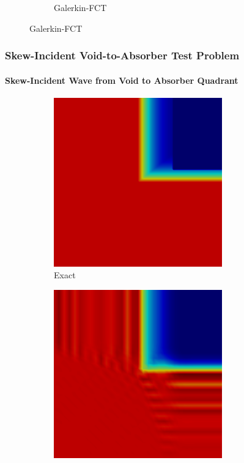 \begin{frame}
\begin{figure}[h]
\begin{subfigure}{0.45\textwidth}
      \caption{Galerkin-FCT}
   \end{subfigure}
\end{figure}

\end{frame}
\begin{frame}
\frametitle{Skew-Incident Void-to-Absorber Test Problem}
\framesubtitle{Skew-Incident Wave from Void to Absorber Quadrant}

\begin{figure}[h]
   \centering
   \begin{subfigure}{0.3\textwidth}
      \centering
      \includegraphics[width=0.8\textwidth]{./figures/skew_exact.png}
      \caption{Exact}
   \end{subfigure}
   \begin{subfigure}{0.3\textwidth}
      \centering
      \includegraphics[width=0.8\textwidth]{./figures/skew_Gal.png}

\end{subfigure}
\end{figure}
\end{frame}
